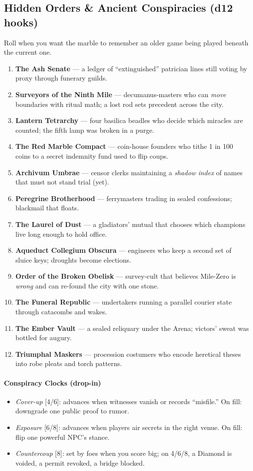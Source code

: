 \subsection*{Hidden Orders \& Ancient Conspiracies (d12 hooks)}
\label{sec:ecktoria-conspiracies}
Roll when you want the marble to remember an older game being played beneath the current one.
\begin{enumerate}
  \item \textbf{The Ash Senate} --- a ledger of ``extinguished'' patrician lines still voting by proxy through funerary guilds.
  \item \textbf{Surveyors of the Ninth Mile} --- decumanus-masters who can \emph{move} boundaries with ritual math; a lost rod sets precedent across the city.
  \item \textbf{Lantern Tetrarchy} --- four basilica beadles who decide which miracles are counted; the fifth lamp was broken in a purge.
  \item \textbf{The Red Marble Compact} --- coin-house founders who tithe 1 in 100 coins to a secret indemnity fund used to flip coups.
  \item \textbf{Archivum Umbrae} --- censor clerks maintaining a \emph{shadow index} of names that must not stand trial (yet).
  \item \textbf{Peregrine Brotherhood} --- ferrymasters trading in sealed confessions; blackmail that floats.
  \item \textbf{The Laurel of Dust} --- a gladiators' mutual that chooses which champions live long enough to hold office.
  \item \textbf{Aqueduct Collegium Obscura} --- engineers who keep a second set of sluice keys; droughts become elections.
  \item \textbf{Order of the Broken Obelisk} --- survey-cult that believes Mile-Zero is \emph{wrong} and can re-found the city with one stone.
  \item \textbf{The Funeral Republic} --- undertakers running a parallel courier state through catacombs and wakes.
  \item \textbf{The Ember Vault} --- a sealed reliquary under the Arena; victors' sweat was bottled for augury.
  \item \textbf{Triumphal Maskers} --- procession costumers who encode heretical theses into robe pleats and torch patterns.
\end{enumerate}

\paragraph{Conspiracy Clocks (drop-in)}
\begin{itemize}
  \item \emph{Cover-up} [4/6]: advances when witnesses vanish or records ``misfile.'' On fill: downgrade one public proof to rumor.
  \item \emph{Exposure} [6/8]: advances when players air secrets in the right venue. On fill: flip one powerful NPC’s stance.
  \item \emph{Countercoup} [8]: set by foes when you score big; on 4/6/8, a Diamond is voided, a permit revoked, a bridge blocked.
\end{itemize}

